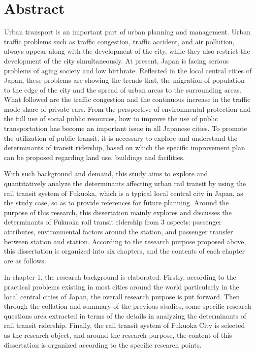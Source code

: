 \documentclass[12pt, twoside, a4paper]{book} %
\begin{document}
\chapter{Abstract}
Urban transport is an important part of urban planning and management. Urban traffic problems such as traffic congestion, traffic accident, and air pollution, always appear along with the development of the city, while they also restrict the development of the city simultaneously. At present, Japan is facing serious problems of aging society and low birthrate. Reflected in the local central cities of Japan, these problems are showing the trends that, the migration of population to the edge of the city and the spread of urban areas to the surrounding areas. What followed are the traffic congestion and the continuous increase in the traffic mode share of private cars. From the perspective of environmental protection and the full use of social public resources, how to improve the use of public transportation has become an important issue in all Japanese cities. To promote the utilization of public transit, it is necessary to explore and understand the determinants of transit ridership, based on which the specific improvement plan can be proposed regarding land use, buildings and facilities.

With such background and demand, this study aims to explore and quantitatively analyze the determinants affecting urban rail transit by using the rail transit system of Fukuoka, which is a typical local central city in Japan, as the study case, so as to provide references for future planning. Around the purpose of this research, this dissertation mainly explores and discusses the determinants of Fukuoka rail transit ridership from 3 aspects: passenger attributes, environmental factors around the station, and passenger transfer between station and station. According to the research purpose proposed above, this dissertation is organized into six chapters, and the contents of each chapter are as follows. 

In chapter 1, the research background is elaborated. Firstly, according to the practical problems existing in most cities around the world particularly in the local central cities of Japan, the overall research purpose is put forward. Then through the collation and summary of the previous studies, some specific research questions area extracted in terms of the details in analyzing the determinants of rail transit ridership. Finally, the rail transit system of Fukuoka City is selected as the research object, and around the research purpose, the content of this dissertation is organized according to the specific research points.
\end{document}
